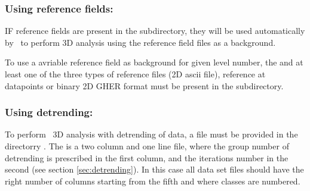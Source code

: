 \begin{center}
\end{center}


\subsubsection{ Using reference fields:}


IF reference fields are present in the  subdirectory, they will be used automatically by \diva\ to perform  3D analysis using the reference field files as a background.\par
 To use a avriable reference field as background for given level number, the  and at least one of the three types of reference files  (2D ascii file), reference at datapoints or  binary 2D GHER format must be present in the  subdirectory.



\begin{center}
\end{center}



\subsubsection{ Using detrending:}


To perform  \diva\ 3D analysis with detrending of data, a  file must be provided  in the directorry . The   is a two column and one line file, where the group number of detrending is prescribed in the first column, and the iterations number in the second (see section \ref{sec:detrending}). In this case all data set files should have the right number of columns starting from the fifth and where classes are numbered.



